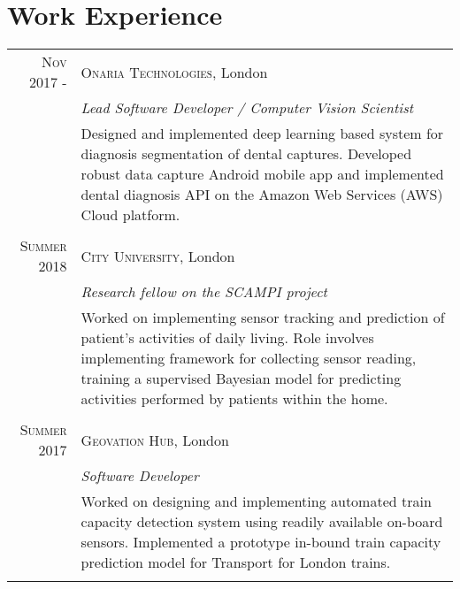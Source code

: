 \documentclass[letterpaper,11pt]{article}
\begin{document}
\section{Work Experience}
\setlength{\tabcolsep}{10pt}
\renewcommand{\arraystretch}{1}
\begin{tabular}{r|p{14cm}}

 
\textsc{Nov 2017 -} & \textsc{Onaria Technologies}, London \\
&\emph{Lead Software Developer / Computer Vision Scientist}\\
&\footnotesize{ Designed and implemented deep learning based system for diagnosis segmentation of dental captures. Developed robust data capture Android mobile app and implemented dental diagnosis API on the Amazon Web Services (AWS) Cloud platform.}\\\multicolumn{2}{c}{} \\

\textsc{Summer 2018} & \textsc{City University}, London \\
&\emph{Research fellow on the SCAMPI project}\\
&\footnotesize{Worked on implementing sensor tracking and prediction of patient's activities of daily living. Role involves implementing framework for collecting sensor reading, training a supervised Bayesian model for predicting activities performed by patients within the home.}\\\multicolumn{2}{c}{} \\

 
\textsc{Summer 2017} & \textsc{Geovation Hub}, London \\
&\emph{Software Developer}\\
&\footnotesize{Worked on designing and implementing automated train capacity detection system using readily available on-board sensors. Implemented a prototype in-bound train capacity prediction model for Transport for London trains.}\\\multicolumn{2}{c}{} \\



\end{tabular}
\end{document}
